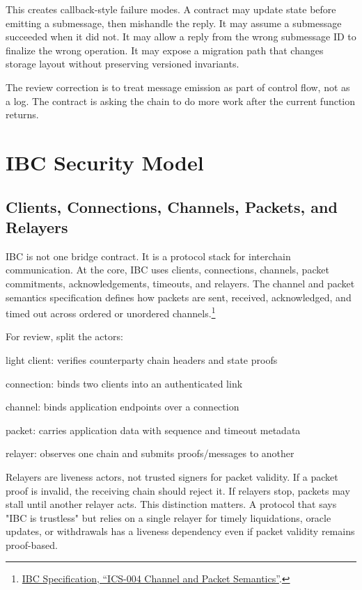 This creates callback-style failure modes. A contract may update state before emitting a submessage, then mishandle the reply. It may assume a submessage succeeded when it did not. It may allow a reply from the wrong submessage ID to finalize the wrong operation. It may expose a migration path that changes storage layout without preserving versioned invariants.

The review correction is to treat message emission as part of control flow, not as a log. The contract is asking the chain to do more work after the current function returns.

\section{IBC Security Model}

\subsection{Clients, Connections, Channels, Packets, and Relayers}

IBC is not one bridge contract. It is a protocol stack for interchain communication. At the core, IBC uses clients, connections, channels, packet commitments, acknowledgements, timeouts, and relayers. The channel and packet semantics specification defines how packets are sent, received, acknowledged, and timed out across ordered or unordered channels.\footnote{\href{https://github.com/cosmos/ibc/blob/main/spec/core/ics-004-channel-and-packet-semantics/README.md}{IBC Specification, ``ICS-004 Channel and Packet Semantics''}.}

For review, split the actors:

\begin{codeblock}
light client:
    verifies counterparty chain headers and state proofs

connection:
    binds two clients into an authenticated link

channel:
    binds application endpoints over a connection

packet:
    carries application data with sequence and timeout metadata

relayer:
    observes one chain and submits proofs/messages to another
\end{codeblock}

Relayers are liveness actors, not trusted signers for packet validity. If a packet proof is invalid, the receiving chain should reject it. If relayers stop, packets may stall until another relayer acts. This distinction matters. A protocol that says "IBC is trustless" but relies on a single relayer for timely liquidations, oracle updates, or withdrawals has a liveness dependency even if packet validity remains proof-based.

